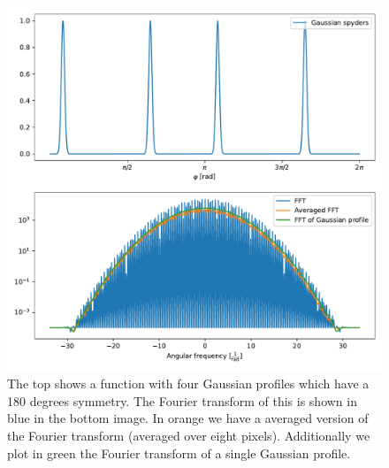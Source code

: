 \begin{figure}[H]
	\centering
		\includegraphics[width=1.0\textwidth]{pics/Gaussian_fourspyders.pdf}
		\caption{The top shows a function with four Gaussian profiles which have a 180 degrees symmetry. The Fourier transform of this is shown in blue in the bottom image. In orange we have a averaged version of the Fourier transform (averaged over eight pixels). Additionally we plot in green the Fourier transform of a single Gaussian profile.}
		\label{fig:Gauss_fourspyders}
\end{figure} 

